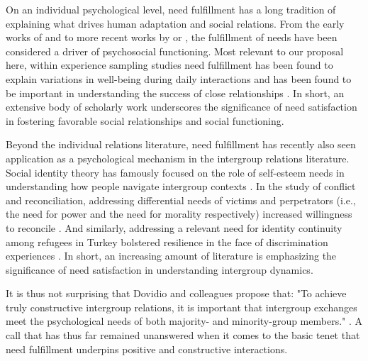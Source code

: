 \documentclass[man, 12pt, a4paper, mask]{apa7}
\theoremstyle{break}
\theoremstyle{plain}
\begin{document}
On an individual psychological level, need fulfillment has a long tradition of explaining what drives human adaptation and social relations. From the early works of \citet[][]{maslow1943} and \citet[][]{lewin1926e} to more recent works by \citet[][]{Ryan2017} or \citet[][]{Steverink2006}, the fulfillment of needs have been considered a driver of psychosocial functioning. Most relevant to our proposal here, within experience sampling studies need fulfillment has been found to explain variations in well-being during daily interactions \citep[][]{Downie2008} and has been found to be important in understanding the success of close relationships \citep[e.g., see][]{knee2023}. In short, an extensive body of scholarly work underscores the significance of need satisfaction in fostering favorable social relationships and social functioning.

Beyond the individual relations literature, need fulfillment has recently also seen application as a psychological mechanism in the intergroup relations literature. Social identity theory has famously focused on the role of self-esteem needs in understanding how people navigate intergroup contexts \citep[e.g.,][]{abrams1988}. In the study of conflict and reconciliation, addressing differential needs of victims and perpetrators (i.e., the need for power and the need for morality respectively) increased willingness to reconcile \citep[][]{Shnabel2008}. And similarly, addressing a relevant need for identity continuity among refugees in Turkey bolstered resilience in the face of discrimination experiences \citep[][]{Celebi2017}. In short, an increasing amount of literature is emphasizing the significance of need satisfaction in understanding intergroup dynamics.

It is thus not surprising that Dovidio and colleagues propose that: "To achieve truly constructive intergroup relations, it is important that intergroup exchanges meet the psychological needs of both majority- and minority-group members." \citep[][p. 6]{Dovidio2017}. A call that has thus far remained unanswered when it comes to the basic tenet that need fulfillment underpins positive and constructive interactions.
\end{document}
